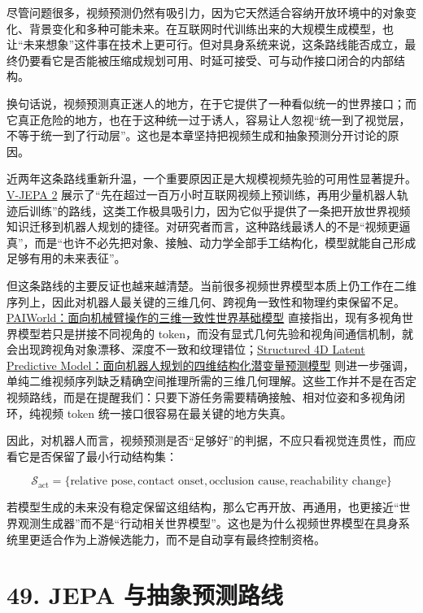 尽管问题很多，视频预测仍然有吸引力，因为它天然适合容纳开放环境中的对象变化、背景变化和多种可能未来。在互联网时代训练出来的大规模生成模型，也让“未来想象”这件事在技术上更可行。但对具身系统来说，这条路线能否成立，最终仍要看它是否能被压缩成规划可用、时延可接受、可与动作接口闭合的内部结构。

换句话说，视频预测真正迷人的地方，在于它提供了一种看似统一的世界接口；而它真正危险的地方，也在于这种统一过于诱人，容易让人忽视“统一到了视觉层，不等于统一到了行动层”。这也是本章坚持把视频生成和抽象预测分开讨论的原因。

近两年这条路线重新升温，一个重要原因正是大规模视频先验的可用性显著提升。\href{https://arxiv.org/abs/2506.09985}{V-JEPA 2} 展示了“先在超过一百万小时互联网视频上预训练，再用少量机器人轨迹后训练”的路线，这类工作极具吸引力，因为它似乎提供了一条把开放世界视频知识迁移到机器人规划的捷径。对研究者而言，这种路线最诱人的不是“视频更逼真”，而是“也许不必先把对象、接触、动力学全部手工结构化，模型就能自己形成足够有用的未来表征”。

但这条路线的主要反证也越来越清楚。当前很多视频世界模型本质上仍工作在二维序列上，因此对机器人最关键的三维几何、跨视角一致性和物理约束保留不足。\href{https://arxiv.org/abs/2606.18375}{PAIWorld：面向机械臂操作的三维一致性世界基础模型} 直接指出，现有多视角世界模型若只是拼接不同视角的 token，而没有显式几何先验和视角间通信机制，就会出现跨视角对象漂移、深度不一致和纹理错位；\href{https://arxiv.org/abs/2607.01166}{Structured 4D Latent Predictive Model：面向机器人规划的四维结构化潜变量预测模型} 则进一步强调，单纯二维视频序列缺乏精确空间推理所需的三维几何理解。这些工作并不是在否定视频路线，而是在提醒我们：只要下游任务需要精确接触、相对位姿和多视角闭环，纯视频 token 统一接口很容易在最关键的地方失真。

因此，对机器人而言，视频预测是否“足够好”的判据，不应只看视觉连贯性，而应看它是否保留了最小行动结构集：

\begingroup
\scriptsize
\begin{equation*}
\mathcal{S}_{\text{act}} =
\{
\text{relative pose},
\text{contact onset},
\text{occlusion cause},
\text{reachability change}
\}
\end{equation*}
\endgroup

若模型生成的未来没有稳定保留这组结构，那么它再开放、再通用，也更接近“世界观测生成器”而不是“行动相关世界模型”。这也是为什么视频世界模型在具身系统里更适合作为上游候选能力，而不是自动享有最终控制资格。

\chapter*{49. JEPA 与抽象预测路线}

